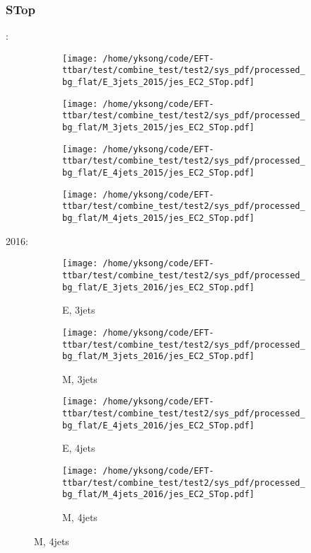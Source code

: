 \documentclass{beamer}
\begin{document}
\begin{frame}
\frametitle{STop}
\fontsize{5}{1}:
\begin{figure}
\centering
\begin{subfigure}[b]{0.24\textwidth}
\texttt{[image: /home/yksong/code/EFT-ttbar/test/combine\_test/test2/sys\_pdf/processed\_bg\_flat/E\_3jets\_2015/jes\_EC2\_STop.pdf]}
\end{subfigure}
\begin{subfigure}[b]{0.24\textwidth}
\texttt{[image: /home/yksong/code/EFT-ttbar/test/combine\_test/test2/sys\_pdf/processed\_bg\_flat/M\_3jets\_2015/jes\_EC2\_STop.pdf]}
\end{subfigure}
\begin{subfigure}[b]{0.24\textwidth}
\texttt{[image: /home/yksong/code/EFT-ttbar/test/combine\_test/test2/sys\_pdf/processed\_bg\_flat/E\_4jets\_2015/jes\_EC2\_STop.pdf]}
\end{subfigure}
\begin{subfigure}[b]{0.24\textwidth}
\texttt{[image: /home/yksong/code/EFT-ttbar/test/combine\_test/test2/sys\_pdf/processed\_bg\_flat/M\_4jets\_2015/jes\_EC2\_STop.pdf]}
\end{subfigure}
\end{figure}
2016:
\begin{figure}
\centering
\begin{subfigure}[b]{0.24\textwidth}
\texttt{[image: /home/yksong/code/EFT-ttbar/test/combine\_test/test2/sys\_pdf/processed\_bg\_flat/E\_3jets\_2016/jes\_EC2\_STop.pdf]}
\captionsetup{font=tiny}
\caption{E, 3jets}
\end{subfigure}
\begin{subfigure}[b]{0.24\textwidth}
\texttt{[image: /home/yksong/code/EFT-ttbar/test/combine\_test/test2/sys\_pdf/processed\_bg\_flat/M\_3jets\_2016/jes\_EC2\_STop.pdf]}
\captionsetup{font=tiny}
\caption{M, 3jets}
\end{subfigure}
\begin{subfigure}[b]{0.24\textwidth}
\texttt{[image: /home/yksong/code/EFT-ttbar/test/combine\_test/test2/sys\_pdf/processed\_bg\_flat/E\_4jets\_2016/jes\_EC2\_STop.pdf]}
\captionsetup{font=tiny}
\caption{E, 4jets}
\end{subfigure}
\begin{subfigure}[b]{0.24\textwidth}
\texttt{[image: /home/yksong/code/EFT-ttbar/test/combine\_test/test2/sys\_pdf/processed\_bg\_flat/M\_4jets\_2016/jes\_EC2\_STop.pdf]}
\captionsetup{font=tiny}
\caption{M, 4jets}
\end{subfigure}
\end{figure}
\end{frame}
\end{document}
